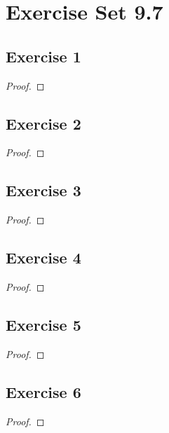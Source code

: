 \documentclass[14pt]{extarticle}
\begin{document}
\section{Exercise Set 9.7}

\subsection{Exercise 1}

\begin{proof}

\end{proof}

\subsection{Exercise 2}

\begin{proof}

\end{proof}

\subsection{Exercise 3}

\begin{proof}

\end{proof}

\subsection{Exercise 4}

\begin{proof}

\end{proof}

\subsection{Exercise 5}

\begin{proof}

\end{proof}

\subsection{Exercise 6}

\begin{proof}

\end{proof}
\end{document}
